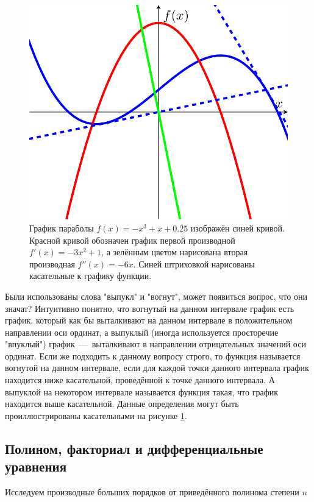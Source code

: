 \documentclass[12pt]{article}
\begin{document}
\begin{figure}[htbp]
\centering
\includegraphics[width=1\linewidth]{fig6}
\caption{График параболы $f(x) = -x^3 + x + 0.25$ изображён синей кривой. Красной кривой обозначен график первой производной $f'(x) = -3x^2+1$, а зелённым цветом нарисована вторая производная $f''(x) = -6x$. Синей штриховкой нарисованы касательные к графику функции.}
\label{fig:71}
\end{figure}

\par Были использованы слова "выпукл" и "вогнут", может появиться вопрос, что они значат? Интуитивно понятно, что вогнутый на данном интервале график есть график, который как бы выталкивают на данном интервале в положительном направлении оси ординат, а выпуклый (иногда используется просторечие "впуклый") график~\----~выталкивают в направлении отрицательных значений оси ординат. Если же подходить к данному вопросу строго, то функция называется вогнутой на данном интервале, если для каждой точки данного интервала график находится ниже касательной, проведённой к точке данного интервала. А выпуклой на некотором интервале называется функция такая, что график находится выше касательной. Данные определения могут быть проиллюстрированы касательными на рисунке \ref{fig:71}. 

\subsection{Полином, факториал и дифференциальные уравнения}
Исследуем производные больших порядков от приведённого полинома степени $n$
\end{document}
